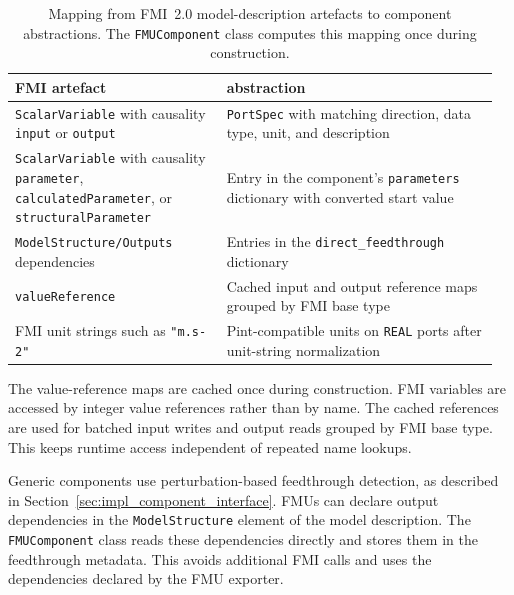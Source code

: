 \begin{table}[t]
  \centering
  \small
  \caption[Mapping from \ac{FMI} model-description artefacts to \syssimx{} abstractions]{Mapping from \ac{FMI}~2.0 model-description artefacts to \syssimx{} component abstractions.
  The \texttt{FMUComponent} class computes this mapping once during construction.}
  \label{tab:fmu_mapping}
  \begin{tabular}{@{}p{0.42\linewidth}p{0.54\linewidth}@{}}
    \toprule
    \textbf{\ac{FMI} artefact} & \textbf{\syssimx{} abstraction} \\
    \midrule
    \texttt{ScalarVariable} with causality \texttt{input} or \texttt{output}
      & \texttt{PortSpec} with matching direction, data type, unit, and description \\
    \addlinespace
    \texttt{ScalarVariable} with causality \texttt{parameter}, \texttt{calculatedParameter}, or \texttt{structuralParameter}
      & Entry in the component's \texttt{parameters} dictionary with converted start value \\
    \addlinespace
    \texttt{ModelStructure/Outputs} dependencies
      & Entries in the \texttt{direct\_feedthrough} dictionary \\
    \addlinespace
    \texttt{valueReference}
      & Cached input and output reference maps grouped by \ac{FMI} base type \\
    \addlinespace
    \ac{FMI} unit strings such as \texttt{"m.s-2"}
      & Pint-compatible units on \texttt{REAL} ports after unit-string normalization \\
    \bottomrule
  \end{tabular}
\end{table}

The value-reference maps are cached once during construction.
\ac{FMI} variables are accessed by integer value references rather than by name.
The cached references are used for batched input writes and output reads grouped by \ac{FMI} base type.
This keeps runtime access independent of repeated name lookups.

Generic components use perturbation-based feedthrough detection, as described in Section~\ref{sec:impl_component_interface}.
\acp{FMU} can declare output dependencies in the \texttt{ModelStructure} element of the model description.
The \texttt{FMUComponent} class reads these dependencies directly and stores them in the feedthrough metadata.
This avoids additional \ac{FMI} calls and uses the dependencies declared by the \ac{FMU} exporter.

